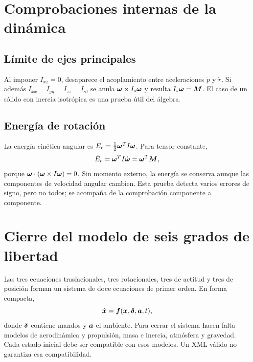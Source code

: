 \section{Comprobaciones internas de la dinámica}
\subsection{Límite de ejes principales}
Al imponer $I_{xz}=0$, desaparece el acoplamiento entre aceleraciones $\dot p$ y $\dot r$. Si además $I_{xx}=I_{yy}=I_{zz}=I_s$, se anula $\boldsymbol{\omega}\times I_s\boldsymbol{\omega}$ y resulta $I_s\dot{\boldsymbol{\omega}}=\boldsymbol{M}$. El caso de un sólido con inercia isotrópica es una prueba útil del álgebra.

\subsection{Energía de rotación}
La energía cinética angular es $E_r=\tfrac12\boldsymbol{\omega}^TI\boldsymbol{\omega}$. Para tensor constante,
\begin{equation}
\dot E_r=\boldsymbol{\omega}^TI\dot{\boldsymbol{\omega}}
=\boldsymbol{\omega}^T\boldsymbol{M},
\end{equation}
porque $\boldsymbol{\omega}\cdot(\boldsymbol{\omega}\times I\boldsymbol{\omega})=0$. Sin momento externo, la energía se conserva aunque las componentes de velocidad angular cambien. Esta prueba detecta varios errores de signo, pero no todos; se acompaña de la comprobación componente a componente.


\section{Cierre del modelo de seis grados de libertad}
Las tres ecuaciones traslacionales, tres rotacionales, tres de actitud y tres de posición forman un sistema de doce ecuaciones de primer orden. En forma compacta,
\begin{equation}
\dot{\boldsymbol{x}}=\boldsymbol{f}(\boldsymbol{x},\boldsymbol{\delta},\boldsymbol{a},t),
\end{equation}
donde $\boldsymbol{\delta}$ contiene mandos y $\boldsymbol{a}$ el ambiente. Para cerrar el sistema hacen falta modelos de aerodinámica y propulsión, masa e inercia, atmósfera y gravedad. Cada estado inicial debe ser compatible con esos modelos. Un XML válido no garantiza esa compatibilidad.

